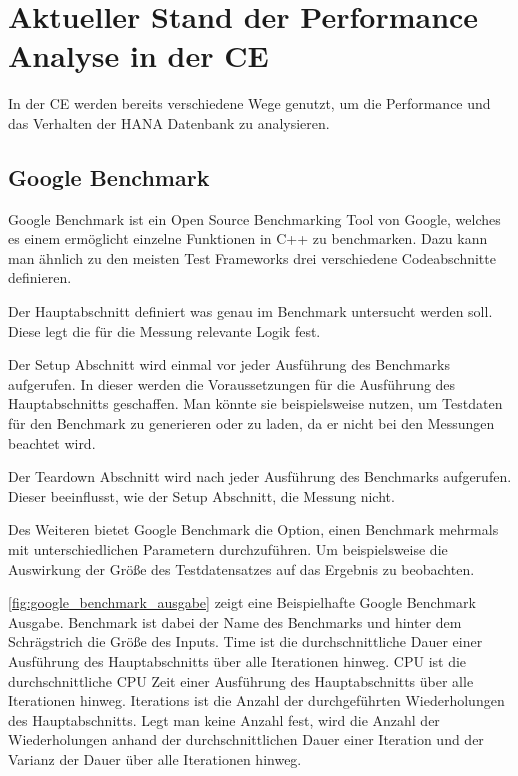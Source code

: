 \chapter{Aktueller Stand der Performance Analyse in der \acl{CE}}
In der \ac{CE} werden bereits verschiedene Wege genutzt, um die Performance und
das Verhalten der HANA Datenbank zu analysieren. 
\section{Google Benchmark}
\label{sec:google_benchmark}

Google Benchmark ist ein Open Source Benchmarking Tool von Google,
welches es einem ermöglicht einzelne Funktionen in C++ zu benchmarken. 
Dazu kann man ähnlich zu den meisten Test Frameworks drei verschiedene
Codeabschnitte definieren.

Der Hauptabschnitt definiert was genau im Benchmark untersucht werden
soll. Diese legt die für die Messung relevante Logik fest.

Der Setup Abschnitt wird einmal vor jeder Ausführung des Benchmarks
aufgerufen. In dieser werden die Voraussetzungen für die Ausführung des Hauptabschnitts
geschaffen. Man könnte sie beispielsweise nutzen, um Testdaten für den Benchmark
zu generieren oder zu laden, da er nicht bei den Messungen beachtet wird.

Der Teardown Abschnitt wird nach jeder Ausführung des Benchmarks aufgerufen.
Dieser beeinflusst, wie der Setup Abschnitt, die Messung nicht.

Des Weiteren bietet Google Benchmark die Option, einen Benchmark mehrmals mit
unterschiedlichen Parametern durchzuführen. Um beispielsweise die Auswirkung
der Größe des Testdatensatzes auf das Ergebnis zu beobachten.

\autoref{fig:google_benchmark_ausgabe} zeigt eine Beispielhafte Google
Benchmark Ausgabe. Benchmark ist dabei der Name des Benchmarks und hinter dem
Schrägstrich die Größe des Inputs. Time ist die durchschnittliche Dauer einer
Ausführung des Hauptabschnitts über alle Iterationen hinweg. CPU ist die
durchschnittliche CPU Zeit einer Ausführung des Hauptabschnitts über alle
Iterationen hinweg. Iterations ist die Anzahl der durchgeführten Wiederholungen
des Hauptabschnitts. Legt man keine Anzahl fest, wird die Anzahl der
Wiederholungen anhand der durchschnittlichen Dauer einer Iteration und der
Varianz der Dauer über alle Iterationen hinweg.
\autocite[Vgl.][]{GoogleBenchmark}

